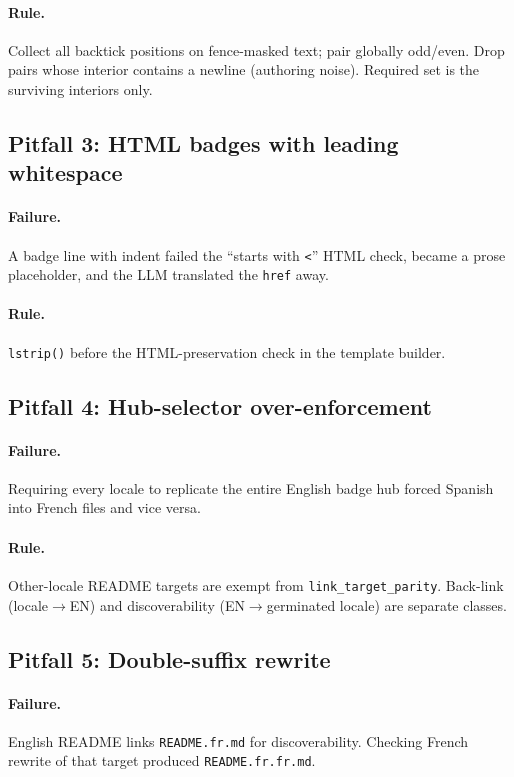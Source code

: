 \documentclass[11pt]{article}
\theoremstyle{definition}
\theoremstyle{plain}
\theoremstyle{remark}
\begin{document}
\paragraph{Rule.} Collect all backtick positions on fence-masked text; pair
globally odd/even. Drop pairs whose interior contains a newline (authoring
noise). Required set is the surviving interiors only.

\subsection{Pitfall 3: HTML badges with leading whitespace}

\paragraph{Failure.} A badge line with indent failed the ``starts with
\texttt{<}'' HTML check, became a prose placeholder, and the LLM translated
the \texttt{href} away.

\paragraph{Rule.} \texttt{lstrip()} before the HTML-preservation check in
the template builder.

\subsection{Pitfall 4: Hub-selector over-enforcement}

\paragraph{Failure.} Requiring every locale to replicate the entire English
badge hub forced Spanish into French files and vice versa.

\paragraph{Rule.} Other-locale README targets are exempt from
\texttt{link\_target\_parity}. Back-link (locale$\to$EN) and discoverability
(EN$\to$germinated locale) are separate classes.

\subsection{Pitfall 5: Double-suffix rewrite}

\paragraph{Failure.} English README links \texttt{README.fr.md} for
discoverability. Checking French rewrite of that target produced
\texttt{README.fr.fr.md}.
\end{document}
